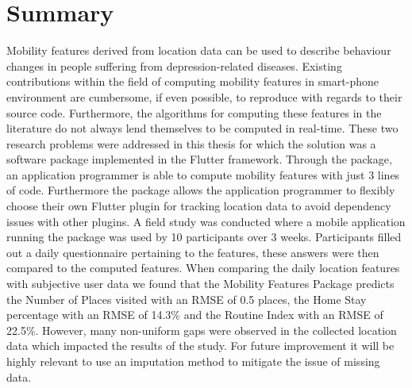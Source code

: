 \chapter{Summary}
Mobility features derived from location data can be used to describe behaviour changes in people suffering from depression-related diseases. Existing contributions within the field of computing mobility features in smart-phone environment are cumbersome, if even possible, to reproduce with regards to their source code. Furthermore, the algorithms for computing these features in the literature do not always lend themselves to be computed in real-time. These two research problems were addressed in this thesis for which the solution was a software package implemented in the Flutter framework. Through the package, an application programmer is able to compute mobility features with just 3 lines of code. Furthermore the package allows the application programmer to flexibly choose their own Flutter plugin for tracking location data to avoid dependency issues with other plugins. A field study was conducted where a mobile application running the package was used by 10 participants over 3 weeks. Participants filled out a daily questionnaire pertaining to the features, these answers were then compared to the computed features. When comparing the daily location features with subjective user data we found that the Mobility Features Package predicts the Number of Places visited with an RMSE of 0.5 places, the Home Stay percentage with an RMSE of 14.3\% and the Routine Index with an RMSE of 22.5\%. However, many non-uniform gaps were observed in the collected location data which impacted the results of the study. For future improvement it will be highly relevant to use an imputation method to mitigate the issue of missing data.
